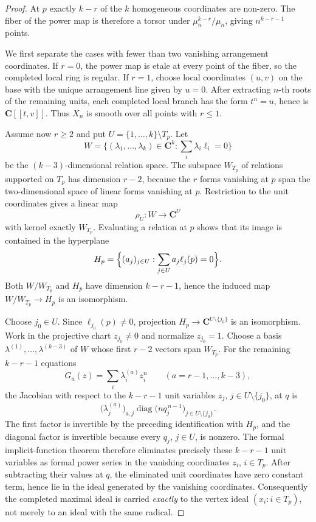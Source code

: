 \documentclass[11pt]{article}
\newcommand{\CC}{\mathbf C}
\begin{document}
\begin{proof}
At $p$ exactly $k-r$ of the $k$ homogeneous coordinates are non-zero.  The
fiber of the power map is therefore a torsor under
$\mu_n^{k-r}/\mu_n$, giving $n^{k-r-1}$ points.

We first separate the cases with fewer than two vanishing arrangement coordinates.
If $r=0$, the power map is etale at every point of the fiber, so the completed
local ring is regular.  If $r=1$, choose local coordinates $(u,v)$ on the base
with the unique arrangement line given by $u=0$.  After extracting $n$-th roots
of the remaining units, each completed local branch has the form $t^n=u$, hence
is $\CC[[t,v]]$.  Thus $X_n$ is smooth over all points with $r\le1$.

Assume now $r\ge2$ and put $U=\{1,\ldots,k\}\setminus T_p$.
Let
\[
 W=\{(\lambda_1,\ldots,\lambda_k)\in\CC^k:
       \textstyle\sum_i\lambda_i\ell_i=0\}
\]
be the $(k-3)$-dimensional relation space.  The subspace $W_{T_p}$ of relations
supported on $T_p$ has dimension $r-2$, because the $r$ forms vanishing at $p$
span the two-dimensional space of linear forms vanishing at $p$.  Restriction
to the unit coordinates gives a linear map
\[
        \rho_U:W\longrightarrow\CC^U
\]
with kernel exactly $W_{T_p}$.  Evaluating a relation at $p$ shows that its image is
contained in the hyperplane
\[
 H_p=\Bigl\{(a_j)_{j\in U}:\sum_{j\in U}a_j\ell_j(p)=0\Bigr\}.
\]
Both $W/W_{T_p}$ and $H_p$ have dimension $k-r-1$, hence the induced map
$W/W_{T_p}\to H_p$ is an isomorphism.

Choose $j_0\in U$.  Since $\ell_{j_0}(p)\ne0$, projection
$H_p\to\CC^{U\setminus\{j_0\}}$ is an isomorphism.  Work in the projective
chart $z_{j_0}\ne0$ and normalize $z_{j_0}=1$.  Choose a basis
$\lambda^{(1)},\ldots,\lambda^{(k-3)}$ of $W$ whose first $r-2$ vectors span
$W_{T_p}$.  For the remaining $k-r-1$ equations
\[
        G_a(z)=\sum_i\lambda_i^{(a)}z_i^n \qquad (a=r-1,\ldots,k-3),
\]
the Jacobian with respect to the $k-r-1$ unit variables
$z_j$, $j\in U\setminus\{j_0\}$, at $q$ is
\[
 \bigl(\lambda_j^{(a)}\bigr)_{a,j}
 \operatorname{diag}\bigl(nq_j^{\,n-1}\bigr)_{j\in U\setminus\{j_0\}}.
\]
The first factor is invertible by the preceding identification with $H_p$, and
the diagonal factor is invertible because every $q_j$, $j\in U$, is nonzero.
The formal implicit-function theorem therefore eliminates precisely these
$k-r-1$ unit variables as formal power series in the vanishing coordinates
$z_i$, $i\in T_p$.  After subtracting their values at $q$, the eliminated unit
coordinates have zero constant term, hence lie in the ideal generated by the
vanishing coordinates.  Consequently the completed maximal ideal is carried
\emph{exactly} to the vertex ideal $(x_i:i\in T_p)$, not merely to an ideal with
the same radical.


\end{proof}
\end{document}
